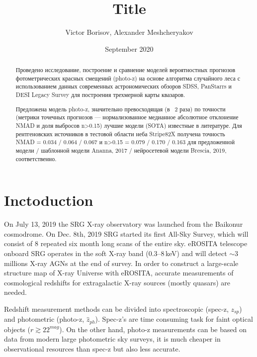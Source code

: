 \documentclass[fleqn,usenatbib]{mnras}
\title[ShortTitle]{Title}
\author[Borisov et al.]{Victor Borisov, Alexander Meshcheryakov %
}
\date{September 2020}
\begin{document}
\maketitle
\begin{abstract}
Проведено исследование, построение и сравнение моделей вероятностных прогнозов фотометрических красных смещений (photo-z) на основе алгоритма случайного леса  с использованием данных современных астрономических обзоров SDSS, PanStarrs и DESI Legacy Survey для построения трехмерной карты квазаров.

Предложена модель photo-z, значительно превосходящая (в ~2 раза) по точности (метрики точечных прогнозов — нормализованное медианное абсолютное отклонение NMAD и доля выбросов n>0.15) лучшие модели (SOTA) известные в литературе. Для рентгеновских источников в тестовой области неба Stripe82X получена точность NMAD = 0.034 / 0.064 / 0.067 и n>0.15 = 0.079 / 0.170 / 0.163 для предложенной модели / шаблонной модели Ananna, 2017 / нейросетевой модели Brescia, 2019, соответственно.
\end{abstract}



\section{Inctoduction}

On July 13, 2019 the SRG X-ray observatory
was launched from the Baikonur cosmodrome. On Dec. 8th, 2019 SRG started its first All-Sky Survey, which will consist of 8 repeated six month long scans of the entire sky. eROSITA telescope \citep{2020arXiv201003477P} onboard SRG operates in the soft X-ray band (0.3–8\,keV) and will detect $\sim3$ millions X-ray AGNs at the end of survey. In order to construct a large-scale structure map of X-ray Universe with eROSITA, accurate measurements of cosmological redshifts for extragalactic X-ray sources (mostly quasars) are needed.

Redshift measurement methods \citep{2019NatAs...3..212S} can be divided into spectroscopic (spec-z, $z_{sp}$) and photometric (photo-z, $\hat{z}_{ph}$). Spec-z's are time consuming task for faint optical objects ($r\gtrsim22^{mag}$). On the other hand, photo-z measurements can be based on data from modern large photometric sky surveys, it is much cheaper in observational resources than spec-z but also less accurate. 
\end{document}
